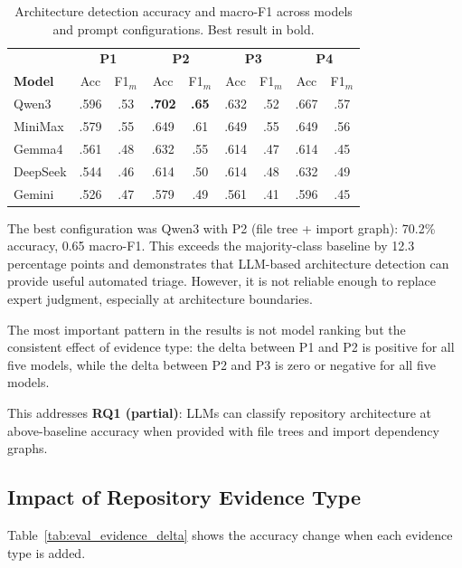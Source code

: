 \begin{table}[H]
\centering
\small
\caption{Architecture detection accuracy and macro-F1 across models and prompt configurations. Best result in bold.}
\label{tab:eval_arch_accuracy}
\begin{tabular}{l|cc|cc|cc|cc}
\toprule
 & \multicolumn{2}{c|}{\textbf{P1}} & \multicolumn{2}{c|}{\textbf{P2}} & \multicolumn{2}{c|}{\textbf{P3}} & \multicolumn{2}{c}{\textbf{P4}} \\
\textbf{Model} & Acc & F1$_m$ & Acc & F1$_m$ & Acc & F1$_m$ & Acc & F1$_m$ \\
\midrule
Qwen3    & .596 & .53 & \textbf{.702} & \textbf{.65} & .632 & .52 & .667 & .57 \\
MiniMax  & .579 & .55 & .649 & .61 & .649 & .55 & .649 & .56 \\
Gemma4   & .561 & .48 & .632 & .55 & .614 & .47 & .614 & .45 \\
DeepSeek & .544 & .46 & .614 & .50 & .614 & .48 & .632 & .49 \\
Gemini   & .526 & .47 & .579 & .49 & .561 & .41 & .596 & .45 \\
\bottomrule
\end{tabular}
\end{table}

The best configuration was Qwen3 with P2 (file tree + import graph): 70.2\% accuracy, 0.65 macro-F1. This exceeds the majority-class baseline by 12.3 percentage points and demonstrates that LLM-based architecture detection can provide useful automated triage. However, it is not reliable enough to replace expert judgment, especially at architecture boundaries.

The most important pattern in the results is not model ranking but the consistent effect of evidence type: the delta between P1 and P2 is positive for all five models, while the delta between P2 and P3 is zero or negative for all five models.

This addresses \textbf{RQ1 (partial)}: LLMs can classify repository architecture at above-baseline accuracy when provided with file trees and import dependency graphs.

\subsection{Impact of Repository Evidence Type}
\label{subsec:eval_evidence}

Table~\ref{tab:eval_evidence_delta} shows the accuracy change when each evidence type is added.

